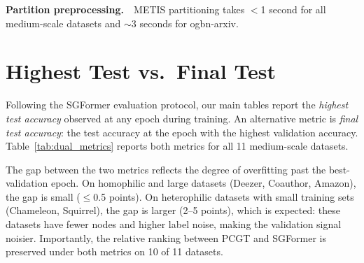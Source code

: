 \documentclass[manuscript, screen, review, anonymous]{acmart}
\begin{document}
\textbf{Partition preprocessing.}~~METIS partitioning takes $<$1 second for all medium-scale datasets and ${\sim}$3 seconds for ogbn-arxiv.

\section{Highest Test vs.\ Final Test}
\label{app:dual_metrics}

Following the SGFormer evaluation protocol, our main tables report the \emph{highest test accuracy} observed at any epoch during training. An alternative metric is \emph{final test accuracy}: the test accuracy at the epoch with the highest validation accuracy. Table~\ref{tab:dual_metrics} reports both metrics for all 11 medium-scale datasets.

The gap between the two metrics reflects the degree of overfitting past the best-validation epoch. On homophilic and large datasets (Deezer, Coauthor, Amazon), the gap is small ($\leq$0.5 points). On heterophilic datasets with small training sets (Chameleon, Squirrel), the gap is larger (2--5 points), which is expected: these datasets have fewer nodes and higher label noise, making the validation signal noisier. Importantly, the relative ranking between PCGT and SGFormer is preserved under both metrics on 10 of 11 datasets.
\end{document}
